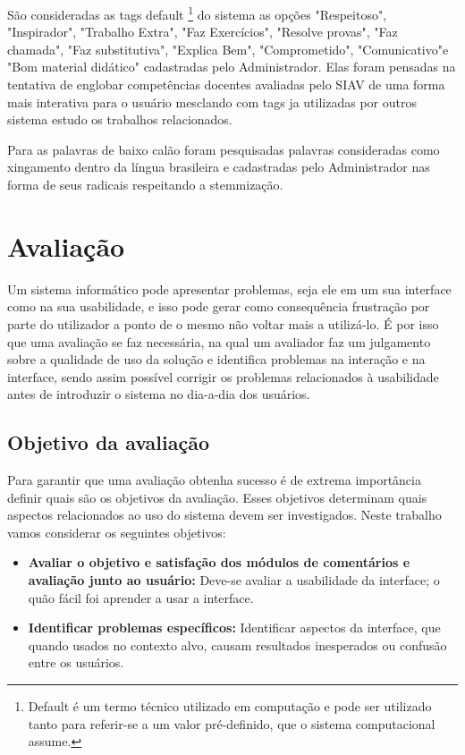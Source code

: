 \documentclass[12pt, a4paper]{report}
\begin{document}
São consideradas as tags default \footnote{Default é um termo técnico utilizado em computação e pode ser utilizado tanto para referir-se a um valor pré-definido, que o sistema computacional assume.} do sistema as opções "Respeitoso", "Inspirador", "Trabalho Extra", "Faz Exercícios", "Resolve provas", "Faz chamada", "Faz substitutiva", "Explica Bem", "Comprometido", "Comunicativo"e "Bom material didático" cadastradas pelo Administrador. Elas foram pensadas na tentativa de englobar competências docentes avaliadas pelo SIAV de uma forma mais interativa para o usuário mesclando com tags ja utilizadas por outros sistema estudo os trabalhos relacionados.

Para as palavras de baixo calão foram pesquisadas palavras consideradas como xingamento dentro da língua brasileira e cadastradas pelo Administrador nas forma de seus radicais respeitando a stemmização.

\chapter{Avaliação}
\label{chapter:avaliacao}

Um sistema informático pode apresentar problemas, seja ele em um sua interface como na sua usabilidade, e isso pode gerar como consequência frustração por parte do utilizador a ponto de o mesmo não voltar mais a utilizá-lo.
É por isso que uma avaliação se faz necessária, na qual um  avaliador faz um julgamento sobre a qualidade de uso da solução e identifica problemas na interação e na interface, sendo assim possível corrigir os problemas relacionados à usabilidade antes de introduzir o sistema no dia-a-dia dos usuários.

\section{Objetivo da avaliação }
Para garantir que uma avaliação obtenha sucesso é de extrema importância definir quais são os objetivos da avaliação. Esses objetivos determinam quais aspectos relacionados ao uso do sistema devem ser investigados. Neste trabalho vamos considerar os seguintes objetivos:
\begin{itemize}
 
 \item{\textbf{Avaliar o objetivo e satisfação dos módulos de comentários e avaliação junto ao usuário:}} Deve-se avaliar a usabilidade da interface; o quão fácil foi aprender a usar a interface.
 \item{\textbf{Identificar problemas específicos:}} Identificar aspectos da interface, que quando usados no contexto alvo, causam resultados inesperados ou confusão entre os usuários.
\end{itemize}
\end{document}
